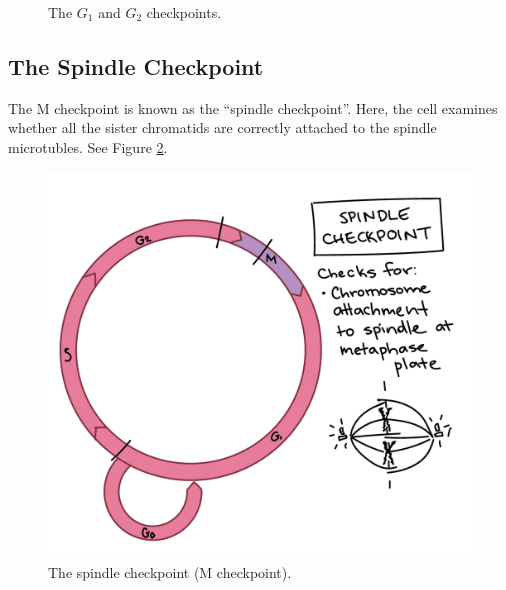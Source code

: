 \documentclass[12pt]{report}
\begin{document}
\begin{figure}[!htb] 
    \centering
    \qquad
    \label{fig:g1-g2-checkpoints}
    \caption{The $G_1$ and $G_2$ checkpoints.}
\end{figure}

\subsection{The Spindle Checkpoint}
\begin{definition}
    The M checkpoint is known as the ``spindle checkpoint''. Here, the cell examines whether all the sister chromatids are correctly attached to the spindle microtubles. See Figure \ref{fig:m-checkpoint}.
\end{definition}

\begin{figure}[H]
\centering
    \includegraphics[width=0.45 \textwidth ]{../figures/m checkpoint.png}
    \caption{The spindle checkpoint (M checkpoint).}
    \label{fig:m-checkpoint}
\end{figure}
\end{document}
